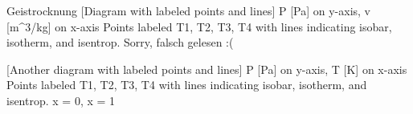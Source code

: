 Geistrocknung
[Diagram with labeled points and lines]
P [Pa] on y-axis, v [m^3/kg] on x-axis
Points labeled T1, T2, T3, T4 with lines indicating isobar, isotherm, and isentrop.
Sorry, falsch gelesen :(

[Another diagram with labeled points and lines]
P [Pa] on y-axis, T [K] on x-axis
Points labeled T1, T2, T3, T4 with lines indicating isobar, isotherm, and isentrop.
x = 0, x = 1